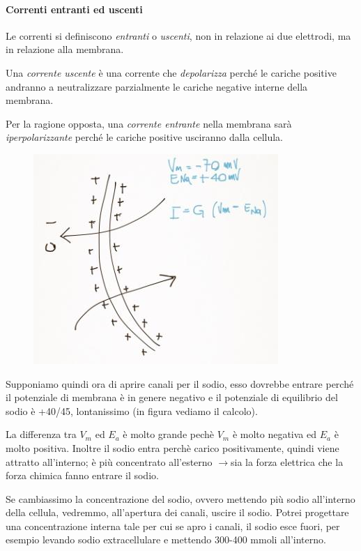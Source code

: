 \documentclass[a4paper,12pt]{article}
\newcommand{\lfreccia}{\ensuremath{\longrightarrow}}
\begin{document}
\paragraph{Correnti entranti ed uscenti}

Le correnti si definiscono \emph{entranti} o \emph{uscenti}, non in relazione ai due elettrodi, ma in relazione alla membrana. 

Una \emph{corrente uscente} è una corrente che \emph{depolarizza} perché le cariche positive andranno a neutralizzare parzialmente le cariche negative interne della membrana. 

Per la ragione opposta, una \emph{corrente entrante} nella membrana sarà \emph{iperpolarizzante} perché le cariche positive usciranno dalla cellula.

\begin{figure}[H]
\centering
\includegraphics[scale=0.5]{immagine/cerr.jpg}
\end{figure}

Supponiamo quindi ora di aprire canali per il sodio, esso dovrebbe entrare perché il potenziale di membrana è in genere negativo e il potenziale di equilibrio del sodio è +40/45, lontanissimo (in figura vediamo il calcolo).

La differenza tra $V_{m}$ ed $E_{a}$ è molto grande pechè $V_{m}$ è molto negativa ed $E_{a}$ è molto positiva. Inoltre il sodio entra perchè carico positivamente, quindi viene attratto all’interno; è più concentrato all'esterno \lfreccia sia la forza elettrica che la forza chimica fanno entrare il sodio.

Se cambiassimo la concentrazione del sodio, ovvero mettendo più sodio all'interno della cellula, vedremmo, all'apertura dei canali, uscire il sodio. Potrei progettare una concentrazione interna tale per cui se apro i canali, il sodio esce fuori, per esempio levando sodio extracellulare e mettendo 300-400 mmoli all’interno.
\end{document}
